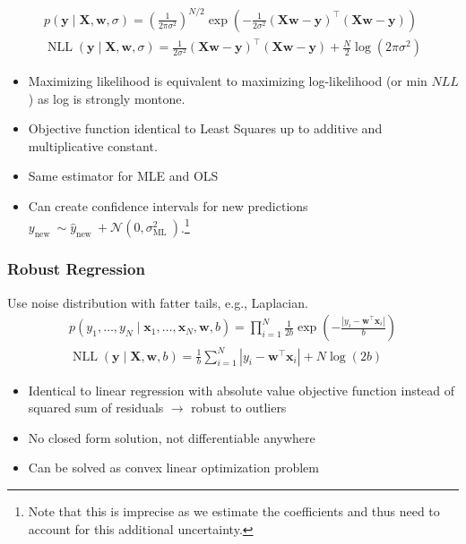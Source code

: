 \documentclass[11pt, %
	oneside, %
	english, %
	onehalfspacing, %
	parskip, %
	]{article} %
\theoremstyle{definition}
\begin{document}
\begin{equation*}
	\begin{aligned}
		p(\mathbf{y} \mid \mathbf{X}, \mathbf{w}, \sigma)=\left(\frac{1}{2 \pi \sigma^2}\right)^{N / 2} \exp \left(-\frac{1}{2 \sigma^2}(\mathbf{X} \mathbf{w}-\mathbf{y})^{\top}(\mathbf{X} \mathbf{w}-\mathbf{y})\right) \\
		\operatorname{NLL}(\mathbf{y} \mid \mathbf{X}, \mathbf{w}, \sigma)=\frac{1}{2 \sigma^2}(\mathbf{X w}-\mathbf{y})^{\top}(\mathbf{X} \mathbf{w}-\mathbf{y})+\frac{N}{2} \log \left(2 \pi \sigma^2\right)
	\end{aligned}
\end{equation*}
\begin{itemize}
	\item Maximizing likelihood is equivalent to maximizing log-likelihood (or min $NLL$) as log is strongly montone.
	\item Objective function identical to Least Squares up to additive and multiplicative constant.
	\item Same estimator for MLE and OLS
	\item Can create confidence intervals for new predictions $y_{\text {new }} \sim \widehat{y}_{\text {new }}+\mathcal{N}\left(0, \sigma_{\text {ML }}^2\right)$.\footnote{Note that this is imprecise as we estimate the coefficients and thus need to account for this additional uncertainty.}
\end{itemize}

\subsubsection*{Robust Regression}

Use noise distribution with fatter tails, e.g., Laplacian.
\begin{align*}
	p\left(y_1, \ldots, y_N \mid \mathbf{x}_1, \ldots, \mathbf{x}_N, \mathbf{w}, b\right)=\prod_{i=1}^N \frac{1}{2 b} \exp \left(-\frac{\left|y_i-\mathbf{w}^{\top} \mathbf{x}_i\right|}{b}\right) \\
	\operatorname{NLL}(\mathbf{y} \mid \mathbf{X}, \mathbf{w}, b)=\frac{1}{b} \sum_{i=1}^N\left|y_i-\mathbf{w}^{\top} \mathbf{x}_i\right|+N \log (2 b)
\end{align*}

\begin{itemize}
	\item Identical to linear regression with absolute value objective function instead of squared sum of residuals $\to$ robust to outliers
	\item No closed form solution, not differentiable anywhere
	\item Can be solved as convex linear optimization problem
\end{itemize}
\end{document}
